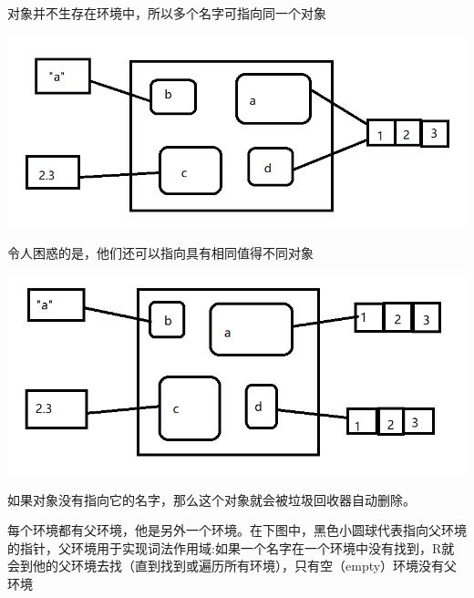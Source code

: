 \documentclass[]{book}
\newenvironment{Shaded}{\begin{snugshade}}{\end{snugshade}}
\newcommand{\DecValTok}[1]{\textcolor[rgb]{0.00,0.00,0.81}{#1}}
\newcommand{\StringTok}[1]{\textcolor[rgb]{0.31,0.60,0.02}{#1}}
\newcommand{\OperatorTok}[1]{\textcolor[rgb]{0.81,0.36,0.00}{\textbf{#1}}}
\newcommand{\NormalTok}[1]{#1}
\begin{document}
对象并不生存在环境中，所以多个名字可指向同一个对象

\begin{Shaded}
\end{Shaded}

\begin{center}\includegraphics{img/ch7-3} \end{center}

令人困惑的是，他们还可以指向具有相同值得不同对象

\begin{Shaded}
\end{Shaded}

\begin{center}\includegraphics{img/ch7-4} \end{center}

如果对象没有指向它的名字，那么这个对象就会被垃圾回收器自动删除。

每个环境都有父环境，他是另外一个环境。在下图中，黑色小圆球代表指向父环境的指针，父环境用于实现词法作用域:如果一个名字在一个环境中没有找到，R就会到他的父环境去找（直到找到或遍历所有环境），只有空（empty）环境没有父环境
\end{document}
